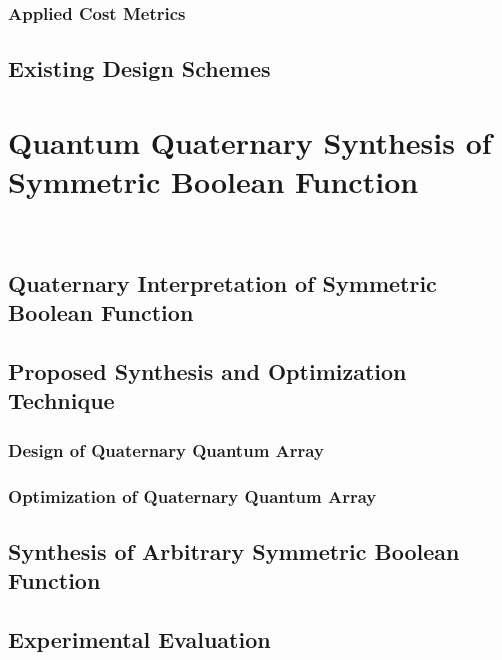 \documentclass[10pt,letterpaper,twoside,openright]{book}
\begin{document}
\newpage

\subsection{Applied Cost Metrics}

\newpage

\section{Existing Design Schemes}

\newpage

\chapter{Quantum Quaternary Synthesis of Symmetric Boolean Function}~\label{ch:quaternary-symm}

\section{Quaternary Interpretation of Symmetric Boolean Function}

\newpage

\section{Proposed Synthesis and Optimization Technique}

\subsection{Design of Quaternary Quantum Array}

\newpage

\subsection{Optimization of Quaternary Quantum Array}

\newpage

\section{Synthesis of Arbitrary Symmetric Boolean Function}

\newpage

\section{Experimental Evaluation}
\end{document}
